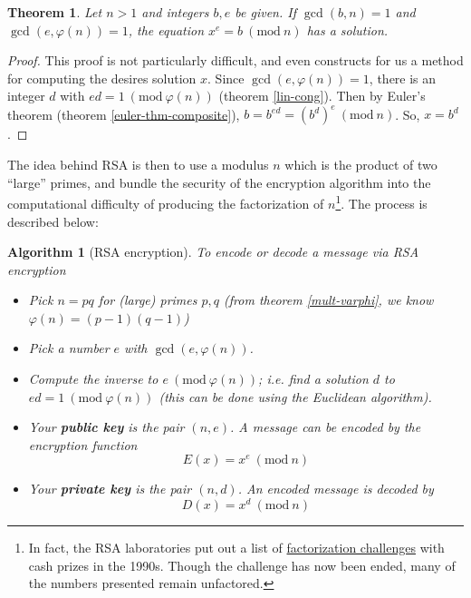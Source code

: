 \documentclass[12pt]{article}
\numberwithin{equation}{subsection}
\newtheorem{thm}[subsection]{Theorem}
\theoremstyle{note}
\newtheorem{algm}[subsection]{Algorithm}
\newcommand{\Mod}[1]{\ (\mathrm{mod}\ #1)}
\begin{document}
\begin{thm} \label{k-th-root}
Let $n>1$ and integers $b,e$ be given. If $\gcd(b,n)=1$ and $\gcd(e,\varphi(n))=1$, the equation $x^e=b\Mod{n}$ has a solution. 
\end{thm}

\begin{proof} This proof is not particularly difficult, and even constructs for us a method for computing the desires solution $x$. Since $\gcd(e,\varphi(n))=1$, there is an integer $d$ with $ed=1\Mod{\varphi(n)}$ (theorem \ref{lin-cong}). Then by Euler's theorem (theorem \ref{euler-thm-composite}), $b=b^{ed}=(b^d)^e \Mod{n}$. So, $x=b^d$. 
\end{proof}

The idea behind RSA is then to use a modulus $n$ which is the product of two ``large'' primes, and bundle the security of the encryption algorithm into the computational difficulty of producing the factorization of $n$\footnote{In fact, the RSA laboratories put out a list of \href{https://en.wikipedia.org/wiki/RSA_Factoring_Challenge}{factorization challenges} with cash prizes in the 1990s. Though the challenge has now been ended, many of the numbers presented remain unfactored.}. The process is described below:

\begin{algm}[RSA encryption] To encode or decode a message via RSA encryption \label{RSA-algm}
\begin{itemize}
	\item Pick $n=pq$ for (large) primes $p,q$ (from theorem \ref{mult-varphi}, we know $\varphi(n)=(p-1)(q-1)$)
	\item Pick a number $e$ with $\gcd(e,\varphi(n))$. 
	\item Compute the inverse to $e\Mod{\varphi(n)}$; i.e. find a solution $d$ to $ed=1\Mod{\varphi(n)}$ (this can be done using the Euclidean algorithm).
	\item Your \textbf{public key} is the pair $(n,e)$. A message can be encoded by the encryption function \begin{equation} E(x)=x^e\Mod{n}\end{equation}
	\item Your \textbf{private key} is the pair $(n,d)$. An encoded message is decoded by \begin{equation}D(x)=x^{d}\Mod{n}\end{equation}
\end{itemize}
\end{algm}
\end{document}
